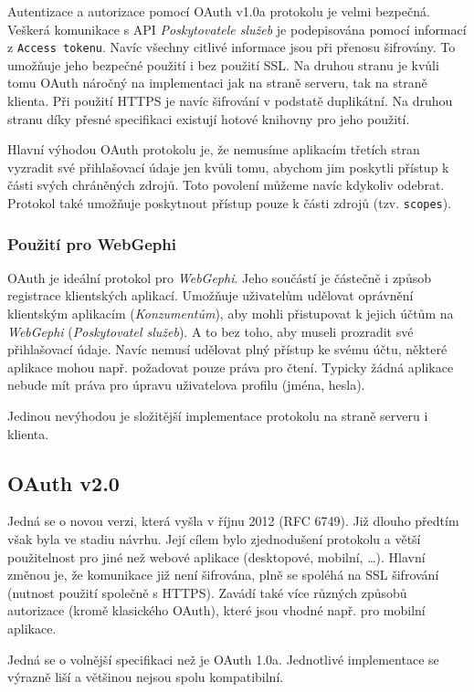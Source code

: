 \documentclass[thesis=M,czech]{FITthesis}[2014/05/6]
\begin{document}
Autentizace a autorizace pomocí OAuth v1.0a protokolu je velmi bezpečná. Veškerá komunikace s API \textit{Poskytovatele služeb} je podepisována pomocí informací z 
\texttt{Access tokenu}. Navíc všechny citlivé informace jsou při přenosu šifrovány. To umožňuje jeho bezpečné použití i bez použití SSL. Na druhou stranu je kvůli tomu OAuth náročný na implementaci 
jak na straně serveru, tak na straně klienta. Při použití HTTPS je navíc šifrování v podstatě duplikátní. Na druhou stranu díky přesné specifikaci existují hotové knihovny pro jeho použití.

Hlavní výhodou OAuth protokolu je, že nemusíme aplikacím třetích stran vyzradit své přihlašovací údaje jen kvůli tomu, abychom jim poskytli přístup k části svých chráněných zdrojů. Toto povolení můžeme navíc
kdykoliv odebrat. Protokol také umožňuje poskytnout přístup pouze k části zdrojů (tzv. \texttt{scopes}).

\subsubsection{Použití pro WebGephi}
OAuth je ideální protokol pro \textit{WebGephi}. Jeho součástí je částečně i způsob registrace klientských aplikací. Umožňuje uživatelům udělovat oprávnění klientským aplikacím (\textit{Konzumentům}), aby mohli 
přistupovat k jejich účtům na \textit{WebGephi} (\textit{Poskytovatel služeb}). A to bez toho, aby museli prozradit své přihlašovací údaje. Navíc nemusí udělovat plný přístup
ke svému účtu, některé aplikace mohou např. požadovat pouze práva pro čtení. Typicky žádná aplikace nebude mít práva pro úpravu uživatelova profilu (jména, hesla).

Jedinou nevýhodou je složitější implementace protokolu na straně serveru i klienta.

\subsection{OAuth v2.0\cite{oauth:v2}}
Jedná se o novou verzi, která vyšla v říjnu 2012 (RFC 6749). Již dlouho předtím však byla ve stadiu návrhu. Její cílem bylo zjednodušení protokolu
a větší použitelnost pro jiné než webové aplikace (desktopové, mobilní, \ldots). Hlavní změnou je, že komunikace již není šifrována, plně se spoléhá na SSL šifrování
(nutnost použití společně s HTTPS). Zavádí také více různých způsobů autorizace (kromě klasického  OAuth), které jsou vhodné např. pro mobilní aplikace.

Jedná se o volnější specifikaci než je OAuth 1.0a. Jednotlivé implementace se výrazně liší a většinou nejsou spolu kompatibilní.
\end{document}
